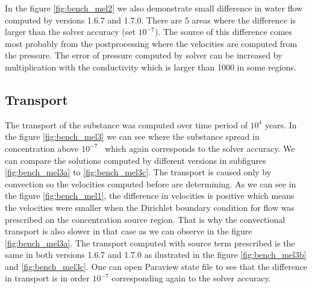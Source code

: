 
In the figure \ref{fig:bench_mel2} we also demonstrate small difference in water flow computed by versions 1.6.7 and 1.7.0. 
There are 5 areas where the difference is larger than the solver accuracy (set $10^{-7}$). The source of this difference comes
most probably from the postprocessing where the velocities are computed from the pressure. The error of pressure computed by solver
can be increased by multiplication with the conductivity which is larger than 1000 in some regions.

\subsection{Transport}
The transport of the substance was computed over time period of $10^4$ years. In the figure \ref{fig:bench_mel3} we can see 
where the substance spread in concentration above $10^{-7}$~ which again corresponds to the solver accuracy.
We can compare the solutions computed by different versions in subfigures \ref{fig:bench_mel3a} to \ref{fig:bench_mel3c}.
The transport is caused only by convection so the velocities computed before are determining. As we can see in the figure 
\ref{fig:bench_mel1}, the difference in velocities is positive which means the velocities were smaller when the Dirichlet 
boundary condition for flow was prescribed on the concentration source region. That is why the convectional transport is 
also slower in that case as we can observe in the figure \ref{fig:bench_mel3a}. 
The transport computed with source term prescribed is the same in both versions 1.6.7 and 1.7.0 as ilustrated in the figure
\ref{fig:bench_mel3b} and \ref{fig:bench_mel3c}. One can open Paraview state file to see that the difference in transport is in
order $10^{-7}$ corresponding again to the solver accuracy.

